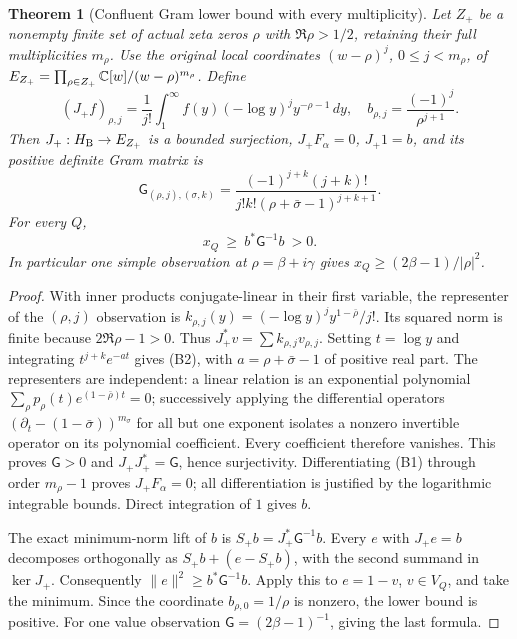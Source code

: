 \documentclass[11pt]{article}
\newtheorem{theorem}{Theorem}[section]
\begin{document}
\begin{theorem}[Confluent Gram lower bound with every multiplicity]\label{thm:NB-jets}
Let $Z_+$ be a nonempty finite set of actual zeta zeros
$\rho$ with $\Re\rho>1/2$, retaining their full multiplicities $m_\rho$.
Use the original local coordinates $(w-\rho)^j$, $0\leq j<m_\rho$,
of $E_{Z_+}=\prod_{\rho\in Z_+}\mathbb C[w]/(w-\rho)^{m_\rho}$.
Define
\[
 (J_+f)_{\rho,j}=\frac1{j!}\int_1^\infty
            f(y)(-\log y)^j y^{-\rho-1}\,dy,
 \quad b_{\rho,j}=\frac{(-1)^j}{\rho^{j+1}}.
\]
Then $J_+:H_{\rm B}\to E_{Z_+}$ is a bounded surjection,
$J_+F_\alpha=0$, $J_+1=b$, and its positive definite Gram matrix is
\[
 \mathsf G_{(\rho,j),(\sigma,k)}
  =\frac{(-1)^{j+k}(j+k)!}
     {j!k!(\rho+\bar\sigma-1)^{j+k+1}}.\tag{B2}
\]
For every $Q$,
\[
 x_Q\ \geq\ b^*\mathsf G^{-1}b\ >0.\tag{B3}
\]
In particular one simple observation at $\rho=\beta+i\gamma$ gives
$x_Q\geq(2\beta-1)/|\rho|^2$.
\end{theorem}
\begin{proof}
With inner products conjugate-linear in their first variable, the
representer of the $(\rho,j)$ observation is
$k_{\rho,j}(y)=(-\log y)^j y^{1-\bar\rho}/j!$.
Its squared norm is finite because $2\Re\rho-1>0$.
Thus $J_+^*v=\sum k_{\rho,j}v_{\rho,j}$.
Setting $t=\log y$ and integrating $t^{j+k}e^{-at}$ gives (B2), with
$a=\rho+\bar\sigma-1$ of positive real part.
The representers are independent: a linear relation is an
exponential polynomial $\sum_\rho p_\rho(t)e^{(1-\bar\rho)t}=0$;
successively applying the differential operators
$(\partial_t-(1-\bar\sigma))^{m_\sigma}$ for all but one exponent
isolates a nonzero invertible operator on its polynomial coefficient.
Every coefficient therefore vanishes. This proves $\mathsf G>0$ and
$J_+J_+^*=\mathsf G$, hence surjectivity.
Differentiating (B1) through order $m_\rho-1$ proves $J_+F_\alpha=0$;
all differentiation is justified by the logarithmic integrable bounds.
Direct integration of $1$ gives $b$.

The exact minimum-norm lift of $b$ is
$S_+b=J_+^*\mathsf G^{-1}b$.
Every $e$ with $J_+e=b$ decomposes orthogonally as
$S_+b+(e-S_+b)$, with the second summand in $\ker J_+$.
Consequently $\|e\|^2\geq b^*\mathsf G^{-1}b$.
Apply this to $e=1-v$, $v\in V_Q$, and take the minimum. Since the
coordinate $b_{\rho,0}=1/\rho$ is nonzero, the lower bound is positive.
For one value observation $\mathsf G=(2\beta-1)^{-1}$, giving the last
formula.
\end{proof}
\end{document}
